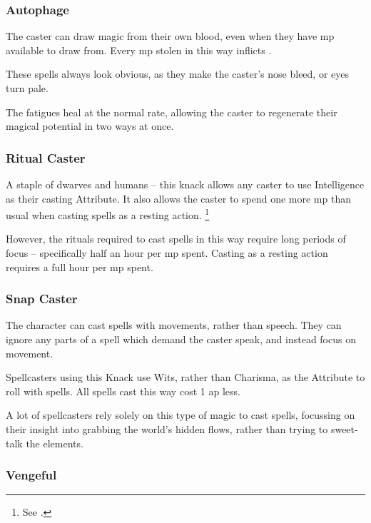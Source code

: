 \begin{multicols}{2}

\subsubsection{Autophage}

The caster can draw magic from their own blood, even when they have \gls{mp} available to draw from.
Every \gls{mp} stolen in this way inflicts .

These spells always look obvious, as they make the caster's nose bleed, or eyes turn pale.

The \glspl{fatigue} heal at the normal rate, allowing the caster to regenerate their magical potential in two ways at once.

\subsubsection{Ritual Caster}
\label{ritualCaster}

A staple of dwarves and humans -- this knack allows any caster to use Intelligence as their casting Attribute.
It also allows the caster to spend one more \gls{mp} than usual when casting spells as a resting action.%
\footnote{See .}

However, the rituals required to cast spells in this way require long periods of focus -- specifically half an hour per \gls{mp} spent.
Casting as a resting action requires a full hour per \gls{mp} spent.

\subsubsection{Snap Caster}

The character can cast spells with movements, rather than speech.
They can ignore any parts of a spell which demand the caster speak, and instead focus on movement.

Spellcasters using this Knack use Wits, rather than Charisma, as the Attribute to roll with spells.
All spells cast this way cost 1 \gls{ap} less.

A lot of spellcasters rely solely on this type of magic to cast spells, focussing on their insight into grabbing the world's hidden flows, rather than trying to sweet-talk the elements.

\subsubsection{Vengeful}


\end{multicols}
